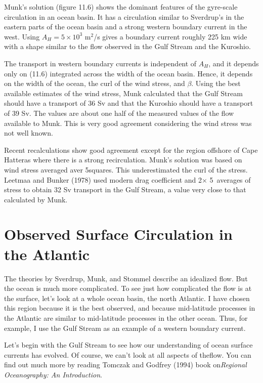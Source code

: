 Munk's solution (figure 11.6) shows the dominant features of the gyre-scale
circulation in an ocean basin. It has a circulation similar to Sverdrup's in the
eastern parts of the ocean basin and a strong western boundary current in the
west. Using $A_H = 5 \times 10^{3}$ m$^2$/s gives a boundary current roughly 225
km wide with a shape similar to the flow observed in the Gulf Stream and the
Kuroshio.

The transport in western boundary currents is
independent of
$A_H$, and it depends only on (11.6) integrated across the width of the ocean basin. Hence, it
depends on the width of the ocean, the curl of the wind stress, and
$\beta$. Using the best available estimates of the wind stress, Munk calculated that the Gulf
Stream should have a transport of
36 Sv and that the Kuroshio should have a transport of 39 Sv. The
values are about one half of the measured values of the flow available to Munk. This is very
good agreement considering the wind stress was not well known.

Recent recalculations show good agreement except for the
region offshore of Cape Hatteras where there is a strong recirculation. Munk's
solution was based on wind stress averaged aver 5\degrees squares. This
underestimated the curl of the stress. Leetmaa and Bunker (1978) used modern drag
coefficient and 2\degrees  $\times$ 5\degrees\ averages of stress to
obtain 32 Sv transport in the Gulf Stream, a value very close to
that calculated by Munk.

\section{Observed Surface Circulation in the Atlantic}
The theories by Sverdrup, Munk, and Stommel describe an idealized flow. But the ocean is much more complicated. To see just how complicated the flow is at the surface, let's look at a whole ocean basin, the north Atlantic. I have chosen this region because it is the best observed, and because mid-latitude processes in the Atlantic are similar to mid-latitude processes in the other ocean. Thus, for example, I use the Gulf Stream as an example of a western boundary current.

Let's begin with the Gulf Stream to see how our understanding of ocean surface currents has evolved. Of course, we can't look at all aspects of theflow. You can find out much more by reading Tomczak and Godfrey (1994) book on\textit{Regional Oceanography: An Introduction}.

